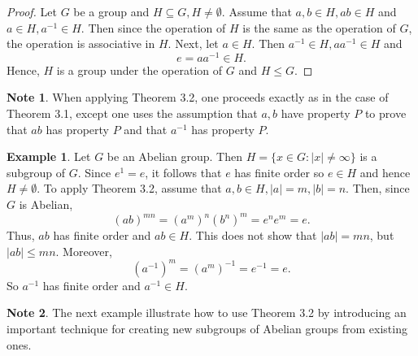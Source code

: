 \documentclass{article}
\theoremstyle{definition}
\newtheorem{example}{Example}[section]
\newtheorem{note}{Note}[section]
\begin{document}
    \begin{proof}
        Let $G$ be a group and $H \subseteq G, H \neq \emptyset$. Assume that $a,b \in H, ab \in H$ and $a \in H, a^{-1}\in H$. Then since the operation of $H$ is the same as the operation of $G$, the operation is associative in $H$. Next, let $a \in H$. Then $a^{-1} \in H, aa^{-1} \in H$ and
        \begin{equation*}
            e = aa^{-1} \in H.
        \end{equation*}
        Hence, $H$ is a group under the operation of $G$ and $H \leq G$.
    \end{proof}
    
    \begin{note}
       When applying Theorem 3.2, one proceeds exactly as in the case of Theorem 3.1, except one uses the assumption that $a,b$ have property $P$ to prove that $ab$ has property $P$ and that $a^{-1}$ has property $P$.
    \end{note}
    
    \begin{example}
    Let $G$ be an Abelian group. Then $H = \{x \in G: |x| \neq \infty\}$ is a subgroup of $G$. Since $e^1 = e$, it follows that $e$ has finite order so $e \in H$ and hence $H \neq \emptyset$. To apply Theorem 3.2, assume that $a,b \in H, |a|=m,|b|=n$. Then, since $G$ is Abelian,
    \begin{equation*}
        (ab)^{mn} = (a^m)^n(b^n)^m = e^ne^m = e.
    \end{equation*}
    Thus, $ab$ has finite order and $ab \in H$. This does not show that $|ab|=mn$, but $|ab| \leq mn$. Moreover, 
    \begin{equation*}
        (a^{-1})^m = (a^m)^{-1} = e^{-1} = e.
    \end{equation*}
    So $a^{-1}$ has finite order and $a^{-1} \in H$.
    \end{example}
    
    \begin{note}
       The next example illustrate how to use Theorem 3.2 by introducing an important technique for creating new subgroups of Abelian groups from existing ones.
    \end{note}
    
\end{document}
